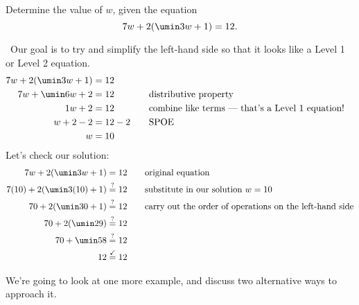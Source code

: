 \begin{boxedex}
Determine the value of $w$, given the equation \[7w + 2(\umin3w + 1) = 12.\]

\exsoln\ Our goal is to try and simplify the left-hand side so that it looks like a Level 1 or Level 2 equation.
\[\begin{aligned}
7w + 2(\umin3w + 1) &= 12\\
7w + \umin6w + 2 &= 12
&&\text{\quad distributive property}\\
1w + 2 & = 12
&&\text{\quad combine like terms --- that's a Level 1 equation!}\\
w + 2 - 2 & = 12 - 2
&&\text{\quad SPOE}\\
w & = 10
\end{aligned}\]
Let's check our solution:
\[\begin{aligned}
7w + 2(\umin3w + 1) &= 12
&& \text{\quad original equation}\\
7(10) + 2(\umin3(10) + 1) &\overset{?}{=} 12
&& \text{\quad substitute in our solution $w = 10$}\\
70 + 2(\umin30 + 1) &\overset{?}{=} 12
&& \text{\quad carry out the order of operations on the left-hand side}\\
70 + 2(\umin29) &\overset{?}{=} 12\\
70 + \umin58 &\overset{?}{=} 12\\
12 &\overset{\checkmark}{=} 12\\
\end{aligned}\]
\end{boxedex}

We're going to look at one more example, and discuss two alternative ways to approach it.

